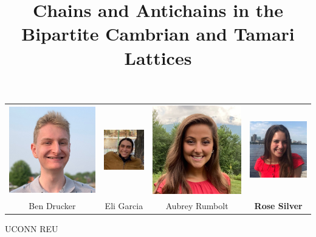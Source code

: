 \documentclass[xcolor=x11names,compress,t]{beamer}
\begin{document}
\begin{frame}
  \title{Chains and Antichains in the Bipartite Cambrian and Tamari Lattices}
  \date{}

\vspace{-2 cm}

  \maketitle
  
  \vspace{-3 cm}
  
  \centering
  \begin{tabular}{c c c c}
  
    \includegraphics[width=.2\linewidth]{Ben.jpeg} &     \includegraphics[width=.2\linewidth]{Eli.jpeg}  & \includegraphics[width=.2\linewidth]{Aubrey.jpeg}  &
    \includegraphics[width=.2\linewidth]{Rose.jpeg} \\
    
    Ben Drucker & Eli Garcia & Aubrey Rumbolt & \textbf{Rose Silver} \\
    \end{tabular}
    
    \centering
    
    \vspace{1 cm}
    
    
    UCONN REU
\end{frame}
    
\end{document}
